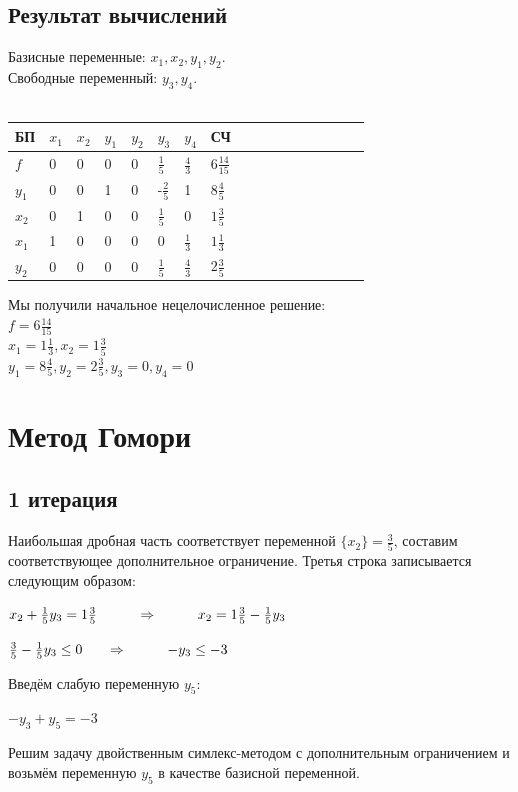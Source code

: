 \documentclass[14pt,a4paper,fleqn]{extarticle}
\begin{document}
	\subsection*{Результат вычислений}
	Базисные переменные: $x_1, x_2, y_1, y_2$.\\
	Свободные переменный: $y_3, y_4$.\\\\
	\begin{tabularx}{\textwidth}{V{1}p{1.45cm}V{1}p{1.45cm}V{1}p{1.45cm}V{1}p{1.45cm}V{1}p{1.45cm}V{1}p{1.45cm}V{1}p{1.4cm}V{1}p{1.52cm}V{1}}
		\hline
		БП & $x_1$ & $x_2$ & $y_1$ & $y_2$ & $y_3$ & $y_4$ & СЧ\\
		\hline
		$f$ & 0 & 0 & 0 & 0 & \small $\frac{1}{5}$ & \small $\frac{4}{3}$ & \small $6\frac{14}{15}$\\
		\hline
		$y_1$ & 0 & 0 & 1 & 0 & \small -$\frac{2}{5}$ & 1 & \small $8\frac{4}{5}$\\
		\hline
		$x_2$ & 0 & 1 & 0 & 0 & \small $\frac{1}{5}$ & 0 & \small $1\frac{3}{5}$\\
		\hline
		$x_1$ & 1 & 0 & 0 & 0 & 0 & \small $\frac{1}{3}$ & \small $1\frac{1}{3}$\\
		\hline
		$y_2$ & 0 & 0 & 0 & 0 & \small $\frac{1}{5}$ & \small $\frac{4}{3}$ & \small $2\frac{3}{5}$\\
		\hline
	\end{tabularx}
	\newline\newline
	Мы получили начальное нецелочисленное решение:\\
	$f = 6\frac{14}{15}$\\
	$x_1 = 1\frac{1}{3}, x_2 = 1\frac{3}{5}$\\
	$y_1 = 8\frac{4}{5}, y_2 = 2\frac{3}{5}, y_3 = 0, y_4 = 0$
	\section*{Метод Гомори}
	\subsection*{1 итерация}
	Наибольшая дробная часть соответствует переменной $\{x_2\} = \frac{3}{5}$, составим соответствующее дополнительное ограничение. Третья строка записывается следующим образом:
	\begin{center}
		$x_2 + \frac{1}{5}y_3 = 1\frac{3}{5} \hspace*{1cm} \Rightarrow \hspace*{1cm} x_2 = 1\frac{3}{5} - \frac{1}{5}y_3$
	\end{center}
	\begin{center}
		$\frac{3}{5} - \frac{1}{5}y_3 \leq 0 \hspace*{0.6cm} \Rightarrow \hspace*{1cm} -y_3 \leq -3$
	\end{center}
	Введём слабую переменную $y_5$:
	\begin{center}
		$-y_3 + y_5 = -3$
	\end{center}
	Решим задачу двойственным симлекс-методом с дополнительным ограничением и возьмём переменную $y_5$ в качестве базисной переменной.
	\newpage
\end{document}
